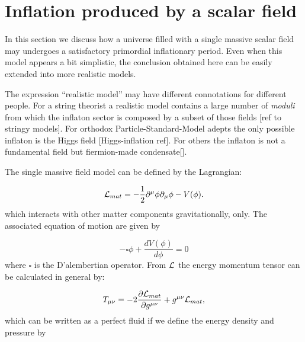 \documentclass[12pt,letterpaper,twoside]{book}
\begin{document}


\section{Inflation produced by a scalar field}\label{sec:inflation_scalar}

In this section we discuss how a universe filled with a single massive scalar
field may undergoes a satisfactory primordial inflationary period. Even when
this model appears a bit simplistic, the conclusion obtained here can be easily
extended into more realistic models.

The expression ``realistic model'' may have different connotations for different
people. For a string theorist a realistic model contains a large number of
\textit{moduli} from which the inflaton sector is composed by a subset of those
fields [ref to stringy models]. For orthodox Particle-Standard-Model adepts the
only possible inflaton is the Higgs field [Higgs-inflation ref]. For others the
inflaton is not a fundamental field but fiermion-made condensate[].

The single massive field model can be defined by the Lagrangian:

\begin{equation}
    {\cal L}_{mat}=-\frac{1}{2}\partial^\mu \phi \partial_\mu \phi -V(\phi).
\end{equation}
which interacts with other matter components gravitationally, only. The associated
equation of motion are given by

\begin{equation}
    -\square \phi + \frac{d V(\phi)}{d\phi}=0
\end{equation}
 where $\square$ is the D'alembertian operator. From ${\cal L}_{}$ the energy
 momentum tensor can be calculated in general by:

\begin{equation}
    T_{\mu \nu } = - 2 \frac{\partial {\cal L}_{mat}}{\partial g^{\mu\nu}} + g^{\mu\nu} {\cal L}_{mat},
\end{equation}
 which can be written as a perfect fluid if we define the energy density and
 pressure by
\end{document}
